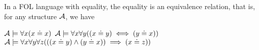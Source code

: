 \begin{proposition}\label{thm:first_order_equality_equivalence_relation}
  In a FOL language with equality, the equality is an equivalence relation, that is, for any structure $\mathcal A$, we have
  \begin{description}
     $\mathcal A \models \forall x (x \doteq x)$
     $\mathcal A \models \forall x \forall y ((x \doteq y) \iff (y \doteq x))$
     $\mathcal A \models \forall x \forall y \forall z (((x \doteq y) \land (y \doteq x)) \implies (x \doteq z))$
  \end{description}
\end{proposition}
